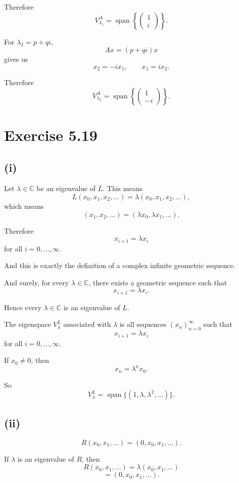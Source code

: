 \documentclass[11pt,a4paper]{article}
\newcommand{\Span}{\operatorname{span}}
\begin{document}
Therefore
\[
V^A_{\lambda_1}=\Span\left\{
\begin{pmatrix}
1\\
i
\end{pmatrix}
\right\}.
\]

For $\lambda_2=p+qi$,
\[
Ax=(p+qi)x
\]
gives us
\[
x_2=-ix_1,
\qquad
x_1=ix_2.
\]

Therefore
\[
V^A_{\lambda_2}=\Span\left\{
\begin{pmatrix}
1\\
-i
\end{pmatrix}
\right\}.
\]

\section*{Exercise 5.19}

\subsection*{(i)}

Let $\lambda\in\mathbb C$ be an eigenvalue of $L$. This means
\[
L(x_0,x_1,x_2,\ldots)=\lambda(x_0,x_1,x_2,\ldots),
\]
which means
\[
(x_1,x_2,\ldots)=(\lambda x_0,\lambda x_1,\ldots).
\]

Therefore
\[
x_{i+1}=\lambda x_i
\]
for all $i=0,\ldots,\infty$.

And this is exactly the definition of a complex infinite geometric sequence.

And surely, for every $\lambda\in\mathbb C$, there exists a geometric sequence such that
\[
x_{i+1}=\lambda x_i.
\]

Hence every $\lambda\in\mathbb C$ is an eigenvalue of $L$.

The eigenspace $V^L_\lambda$ associated with $\lambda$ is all sequences $(x_n)_{n=0}^{\infty}$ such that
\[
x_{i+1}=\lambda x_i
\]
for all $i=0,\ldots,\infty$.

If $x_0\neq0$, then
\[
x_n=\lambda^n x_0.
\]

So
\[
V^L_\lambda=\Span\{(1,\lambda,\lambda^2,\ldots)\}.
\]

\subsection*{(ii)}

\[
R(x_0,x_1,\ldots)=(0,x_0,x_1,\ldots).
\]

If $\lambda$ is an eigenvalue of $R$, then
\[
R(x_0,x_1,\ldots)=\lambda(x_0,x_1,\ldots)
\]
\[
=(0,x_0,x_1,\ldots).
\]
\end{document}
